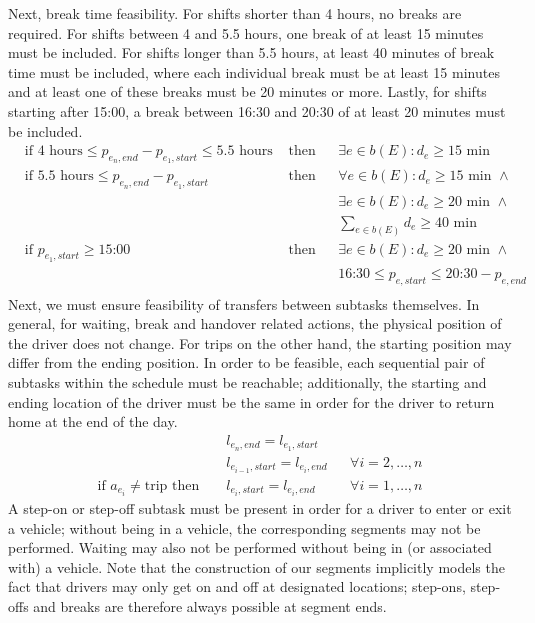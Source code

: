 \documentclass[]{article}
\begin{document}
Next, break time feasibility. For shifts shorter than 4 hours, no breaks are required. For shifts between 4 and 5.5 hours, one break of at least 15 minutes must be included. For shifts longer than 5.5 hours, at least 40 minutes of break time must be included, where each individual break must be at least 15 minutes and at least one of these breaks must be 20 minutes or more. Lastly, for shifts starting after 15:00, a break between 16:30 and 20:30 of at least 20 minutes must be included. 
\begin{align}
  &\text{if } 4 \text{ hours} \leq p_{e_n,end} - p_{e_1,start} \leq 5.5 \text{ hours}&\text{ then} && \exists e \in b(E) : d_e \geq 15 \text{ min} \\
  &\text{if } 5.5 \text{ hours} \leq p_{e_n,end} - p_{e_1,start} &\text{ then} && \forall e \in b(E) : d_e \geq 15\text{ min } \land \\
  &&&& \exists e \in b(E) : d_e \geq 20 \text{ min } \land \\
  &&&& \sum_{e \in b(E)}d_e \geq 40 \text{ min} \\
  &\text{if } p_{e_1,start} \geq \text{15:00} &\text{ then} && \exists e \in b(E) : d_e \geq 20 \text{ min } \land \\
  &&&& \text{16:30} \leq p_{e,start} \leq \text{20:30} - p_{e,end}  \\
\end{align}
Next, we must ensure feasibility of transfers between subtasks themselves. In general, for waiting, break and handover related actions, the physical position of the driver does not change. For trips on the other hand, the starting position may differ from the ending position. In order to be feasible, each sequential pair of subtasks within the schedule must be reachable; additionally, the starting and ending location of the driver must be the same in order for the driver to return home at the end of the day.
\begin{align}
  && l_{e_n,end} = l_{e_1,start} && \\
  && l_{e_{i-1},start} = l_{e_i,end} && \forall i = 2, \dots, n \\
  \text{if } a_{e_i} \neq \text{trip} \text{ then } && l_{e_i,start} = l_{e_i,end} && \forall i = 1, \dots, n
\end{align}
A step-on or step-off subtask must be present in order for a driver to enter or exit a vehicle; without being in a vehicle, the corresponding segments may not be performed. Waiting may also not be performed without being in (or associated with) a vehicle. Note that the construction of our segments implicitly models the fact that drivers may only get on and off at designated locations; step-ons, step-offs and breaks are therefore always possible at segment ends.
\end{document}
